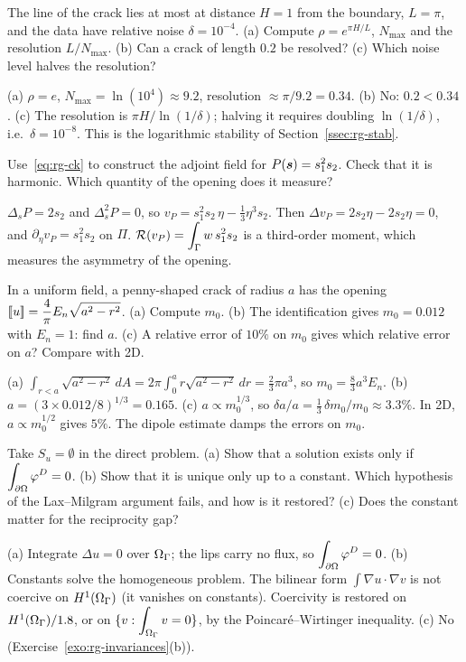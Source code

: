 The line of the crack lies at most at distance $H=1$ from the boundary, $L=\pi$, and the data have relative noise $\delta=10^{-4}$. (a) Compute $\rho=e^{\pi H/L}$, $N_{\max}$ and the resolution $L/N_{\max}$. (b) Can a crack of length $0.2$ be resolved? (c) Which noise level halves the resolution?
\begin{solution}
(a) $\rho=e$, $N_{\max}=\ln(10^4)\approx9.2$, resolution $\approx\pi/9.2=0.34$. (b) No: $0.2<0.34$. (c) The resolution is $\pi H/\ln(1/\delta)$; halving it requires doubling $\ln(1/\delta)$, i.e.\ $\delta=10^{-8}$. This is the logarithmic stability of Section~\ref{ssec:rg-stab}.
\end{solution}

Use~\eqref{eq:rg-ck} to construct the adjoint field for $P(\bm{s})=s_1^2s_2$. Check that it is harmonic. Which quantity of the opening does it measure?
\begin{solution}
$\Delta_sP=2s_2$ and $\Delta_s^2P=0$, so $v_P=s_1^2s_2\,\eta-\tfrac13\eta^3s_2$. Then $\Delta v_P=2s_2\eta-2s_2\eta=0$, and $\partial_\eta v_P=s_1^2s_2$ on $\Pi$. $\displaystyle \mathcal{R}(v_P)=\int_\Gamma w\,s_1^2s_2$ is a third-order moment, which measures the asymmetry of the opening.
\end{solution}

In a uniform field, a penny-shaped crack of radius $a$ has the opening $\displaystyle [\![u]\!]=\frac4\pi E_n\sqrt{a^2-r^2}$.
(a) Compute $m_0$. (b) The identification gives $m_0=0.012$ with $E_n=1$: find $a$. (c) A relative error of $10\%$ on $m_0$ gives which relative error on $a$? Compare with 2D.
\begin{solution}
(a) $\displaystyle \int_{r<a}\sqrt{a^2-r^2}\,dA=2\pi\int_0^ar\sqrt{a^2-r^2}\,dr=\tfrac23\pi a^3$, so $m_0=\tfrac83a^3E_n$.
(b) $a=(3\times0.012/8)^{1/3}=0.165$.
(c) $a\propto m_0^{1/3}$, so $\delta a/a=\tfrac13\,\delta m_0/m_0\approx3.3\%$. In 2D, $a\propto m_0^{1/2}$ gives $5\%$. The dipole estimate damps the errors on $m_0$.
\end{solution}

Take $S_u=\emptyset$ in the direct problem. (a) Show that a solution exists only if $\displaystyle \int_{\partial\Omega}\varphi^{D}=0$. (b) Show that it is unique only up to a constant. Which hypothesis of the Lax--Milgram argument fails, and how is it restored? (c) Does the constant matter for the reciprocity gap?
\begin{solution}
(a) Integrate $\Delta u=0$ over $\Omega_\Gamma$; the lips carry no flux, so $\displaystyle \int_{\partial\Omega}\varphi^{D}=0$.
(b) Constants solve the homogeneous problem. The bilinear form $\displaystyle \int\nabla u\cdot\nabla v$ is not coercive on $H^1(\Omega_\Gamma)$ (it vanishes on constants). Coercivity is restored on $H^1(\Omega_\Gamma)/1.8$, or on $\displaystyle \{v:\int_{\Omega_\Gamma}v=0\}$, by the Poincaré--Wirtinger inequality.
(c) No (Exercise~\ref{exo:rg-invariances}(b)).
\end{solution}

